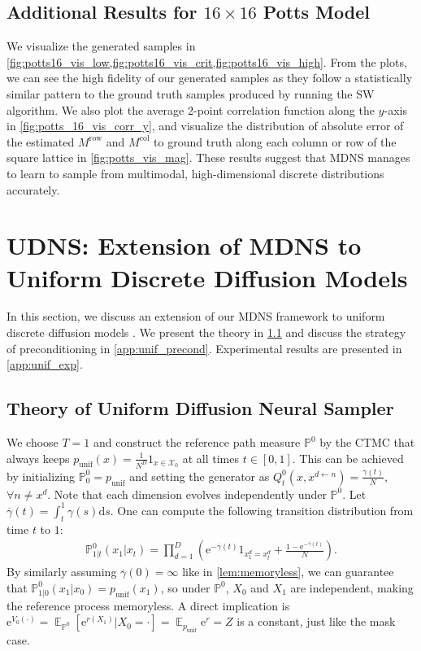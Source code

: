 \documentclass{article}
\theoremstyle{remark}
\newcommand{\ro}[1]{\left(#1\right)} %
\newcommand{\e}{\mathrm{e}}
\renewcommand{\P}{\mathbb{P}}
\newcommand{\E}{\operatorname{\mathbb{E}}}
\renewcommand{\d}{\mathrm{d}}
\newcommand{\cX}{\mathcal{X}}
\newcommand{\gammab}{{\overline{\gamma}}}
\newcommand{\punif}{p_\mathrm{unif}}
\begin{document}
\subsection{Additional Results for $16 \times 16$ Potts Model}
We visualize the generated samples in \cref{fig:potts16_vis_low,fig:potts16_vis_crit,fig:potts16_vis_high}. From the plots, we can see the high fidelity of our generated samples as they follow a statistically similar pattern to the ground truth samples produced by running the SW algorithm. We also plot the average 2-point correlation function along the $y$-axis in \cref{fig:potts_16_vis_corr_y}, and visualize the distribution of absolute error of the estimated $M^{\mathrm{row}}$ and $M^{\mathrm{col}}$ to ground truth along each column or row of the square lattice in \cref{fig:potts_vis_mag}. These results suggest that MDNS manages to learn to sample from multimodal, high-dimensional discrete distributions accurately. 


\section{UDNS: Extension of MDNS to Uniform Discrete Diffusion Models}
\label{app:unif}
In this section, we discuss an extension of our MDNS framework to uniform discrete diffusion models \cite{lou2024discrete,schiff2025simple}. We present the theory in \cref{app:unif_theory} and discuss the strategy of preconditioning in \cref{app:unif_precond}. Experimental results are presented in \cref{app:unif_exp}.


\subsection{Theory of Uniform Diffusion Neural Sampler}
\label{app:unif_theory}
We choose $T=1$ and construct the reference path measure $\P^0$ by the CTMC that always keeps $\punif(x)=\frac{1}{N^D}1_{x\in\cX_0}$ at all times $t\in[0,1]$. This can be achieved by initializing $\P^0_0=\punif$ and setting the generator as $Q^0_t(x,x^{d\gets n})=\frac{\gamma(t)}{N}$, $\forall n\ne x^d$. Note that each dimension evolves independently under $\P^0$. Let $\gammab(t)=\int_t^1\gamma(s)\d s$. One can compute the following transition distribution from time $t$ to $1$:
\begin{align}
    \P^0_{1|t}(x_1|x_t)=\prod_{d=1}^{D}\ro{\e^{-\gammab(t)}1_{x_1^d=x_t^d}+\frac{1-\e^{-\gammab(t)}}{N}}.
    \label{eq:unif_P0_trans}
\end{align}
By similarly assuming $\gammab(0)=\infty$ like in \cref{lem:memoryless}, we can guarantee that $\P^0_{1|0}(x_1|x_0)=\punif(x_1)$, so under $\P^0$, $X_0$ and $X_1$ are independent, making the reference process memoryless. A direct implication is $\e^{V_0(\cdot)}=\E_{\P^0}[\e^{r(X_1)}|X_0=\cdot]=\E_{\punif}\e^r=Z$ is a constant, just like the mask case.
\end{document}
